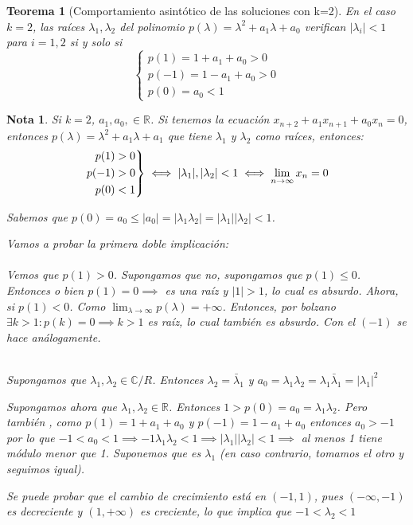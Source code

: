 \documentclass[11pt, a4paper]{article}
\newif\IfInSansMode
\numberwithin{equation}{section}
\newcommand{\R}{\mathbb{R}}
\theoremstyle{theorem-style}
\newtheorem{nth}{Teorema}[section]
\theoremstyle{definition-style}
\theoremstyle{remark-style}
\newtheorem*{nota}{Nota}
\theoremstyle{example-style}
\newenvironment{rcases}
  {\left.\begin{aligned}}
  {\end{aligned}\right\rbrace}
\begin{document}
       \begin{nth}[Comportamiento asintótico de las soluciones con k=2]
        En el caso $k = 2$, las raíces $\lambda_{1}, \lambda_{2}$ del polinomio
        $p(\lambda) = \lambda^2 + a_{1}\lambda + a_{0}$ verifican $|\lambda_{i}|
        < 1$ para $i = 1, 2$ si y solo si
        $$
        \begin{cases}
          p(1) = 1 + a_{1} + a_{0} > 0 \\
          p(-1) = 1 - a_{1} + a_{0} > 0 \\
          p(0) = a_{0} < 1
        \end{cases}
        $$
      \end{nth}

\begin{nota}
	Si $k=2$, $a_1,a_0 ,\in \R$. Si tenemos la ecuación $x_{n+2} + a_1 x _{n+1}	+ a_0 x_n =0$, entonces $p(\lambda) = \lambda^2 + a_1 \lambda + a_1$ que tiene $\lambda_1 $ y $\lambda_2$ como raíces, entonces:
	\[
	\begin{rcases}
	p(1) > 0\\
	p(-1) > 0\\
	p(0) < 1
\end{rcases} \iff |\lambda_1|,|\lambda_2| < 1 \iff \lim_{n\to \infty } x_n  = 0
	\]
	
	Sabemos que $p(0) = a_0 \leq |a_0| = |\lambda_1 \lambda_2| = |\lambda_1||\lambda_2| < 1$.
	
	Vamos a probar la primera doble implicación:\\
	\boxed{\Rightarrow}\hfill \\	
	Vemos que $p(1)> 0$. Supongamos que no, supongamos que $p(1) \leq 0$. Entonces o bien $p(1) = 0\implies $ es una raíz y $|1|>1$, lo cual es absurdo. Ahora, si $p(1) < 0$. Como $\lim_{\lambda \to \infty} p(\lambda) = + \infty$. Entonces, por bolzano $\exists k > 1 : p(k) = 0 \implies k > 1$ es raíz, lo cual también es absurdo. Con el $(-1)$ se hace análogamente.
	
	\boxed{\Leftarrow}\hfill \\
	Supongamos que $\lambda_1, \lambda_2 \in \mathbb C\slash R$. Entonces $\lambda_2 = \bar \lambda_1$ y $a_0 = \lambda_1 \lambda_2 = \lambda_1 \bar \lambda_1 = |\lambda_1|^2$
	
	Supongamos ahora que $\lambda_1,\lambda_2 \in \R$. Entonces $1 > p(0) = a_0 = \lambda_1 \lambda_2$. Pero también , como $p(1) = 1+a_1+a_0$ y $p(-1) = 1-a_1+a_0$ entonces $a_0 > -1$ por lo que $-1 < a_0 < 1\implies -1 \lambda_1 \lambda_2 < 1 \implies |\lambda_1||\lambda_2| < 1 \implies$ al menos 1 tiene módulo menor que 1. Suponemos que es $\lambda_1$ (en caso contrario, tomamos el otro y seguimos igual).
	
	Se puede probar que el cambio de crecimiento está en $(-1,1)$, pues $(-\infty,-1)$ es decreciente y $(1,+\infty)$ es creciente, lo que implica que $-1 < \lambda_2 < 1$
\end{nota}
\end{document}
